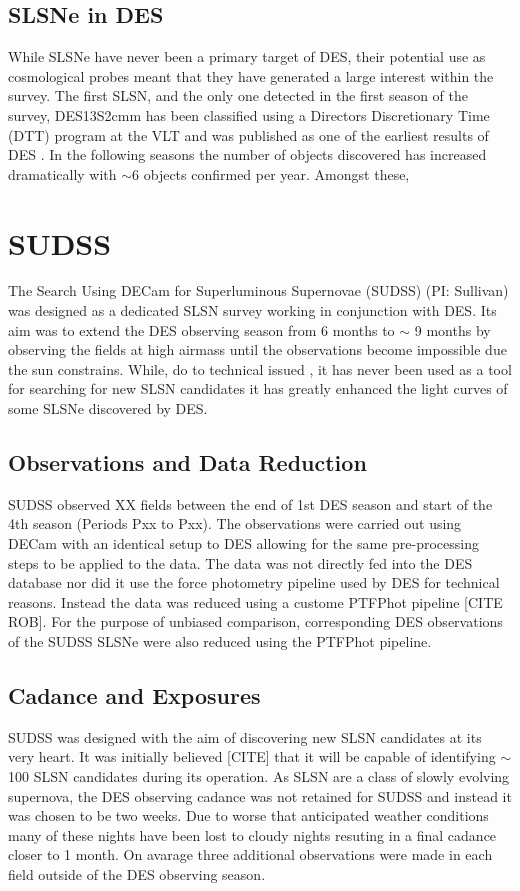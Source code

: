 \subsection{SLSNe in DES}
\label{sec:DES_SLSN}
While SLSNe have never been a primary target of DES, their potential use as cosmological probes \citep{Inserra2014} meant that they have generated a large interest within the survey. The first SLSN, and the only one detected in the first season of the survey, DES13S2cmm has been classified using a Directors Discretionary Time (DTT) program at the VLT and was published as one of the earliest results of DES \cite{Papadopoulos2015}. In the following seasons the number of objects discovered has increased dramatically with $\sim$6 objects confirmed per year. Amongst these,

\section{SUDSS}
The Search Using DECam for Superluminous Supernovae (SUDSS) (PI: Sullivan) was designed as a dedicated SLSN survey working in conjunction with DES. Its aim was to extend the DES observing season from 6 months to $\sim$ 9 months by observing the fields at high airmass until the observations become impossible due the sun constrains. While, do to technical issued , it has never been used as a tool for searching for new SLSN candidates it has greatly enhanced the light curves of some SLSNe discovered by DES.

\subsection{Observations and Data Reduction}
SUDSS observed XX fields between the end of 1st DES season and start of the 4th season (Periods Pxx to Pxx). The observations were carried out using DECam with an identical setup to DES allowing for the same pre-processing steps to be applied to the data. The data was not directly fed into the DES database nor did it use the force photometry pipeline used by DES for technical reasons. Instead the data was reduced using a custome PTFPhot pipeline [CITE ROB]. For the purpose of unbiased comparison, corresponding DES observations of the SUDSS SLSNe were also reduced using the PTFPhot pipeline.

\subsection{Cadance and Exposures}
\label{sec:SUDSSCadance}
SUDSS was designed with the aim of discovering new SLSN candidates at its very heart. It was initially believed [CITE] that it will be capable of identifying $\sim$ 100 SLSN candidates during its operation. As SLSN are a class of slowly evolving supernova, the DES observing cadance was not retained for SUDSS and instead it was chosen to be two weeks. Due to worse that anticipated weather conditions many of these nights have been lost to cloudy nights resuting in a final cadance closer to 1 month. On avarage three additional observations were made in each field outside of the DES observing season.

